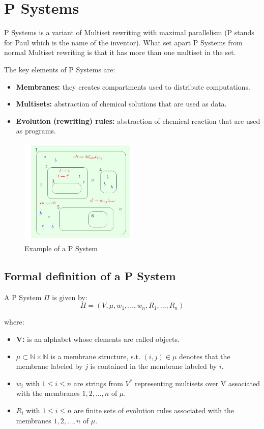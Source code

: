 \section{P Systems}
P Systems is a variant of Multiset rewriting with maximal parallelism (P stands for Paul which is the name of the inventor). What set apart P Systems from normal Multiset rewriting is that it has more than one multiset in the set.\par
The key elements of P Systems are:
\begin{itemize}
    \item \textbf{Membranes:} they creates compartments used to distribute computations.
    \item \textbf{Multisets:} abstraction of chemical solutions that are used as data.
    \item \textbf{Evolution (rewriting) rules:} abstraction of chemical reaction that are used as programs.
\end{itemize}

\begin{figure}[h]
    \centering
    \includegraphics[width=0.5\textwidth]{Images/11-Multiset Rewriting and P Systems/PSystem.png}
    \caption{Example of a P System} 
\end{figure}

\subsection{Formal definition of a P System}
A P System $\Pi$ is given by:
\begin{equation*}
    \Pi = (V, \mu, w_{1}, ..., w_{n}, R_{1}, ..., R_{n})
\end{equation*}

where:
\begin{itemize}
    \item \textbf{V:} is an alphabet whose elements are called objects.
    \item $\mu \subset \mathbb{N} \times \mathbb{N}$ is a membrane structure, s.t. $(i, j) \in \mu$ denotes that the membrane labeled by $j$ is contained in the membrane labeled by $i$.
    \item $w_{i}$ with $1 \leq i \leq n$ are strings from $V^{*}$ representing multisets over V associated with the membranes $1, 2, ..., n$ of $\mu$.
    \item $R_i$ with $1 \leq i \leq n$ are finite sets of evolution rules associated with the membranes $1, 2, ..., n$ of $\mu$.
\end{itemize}

